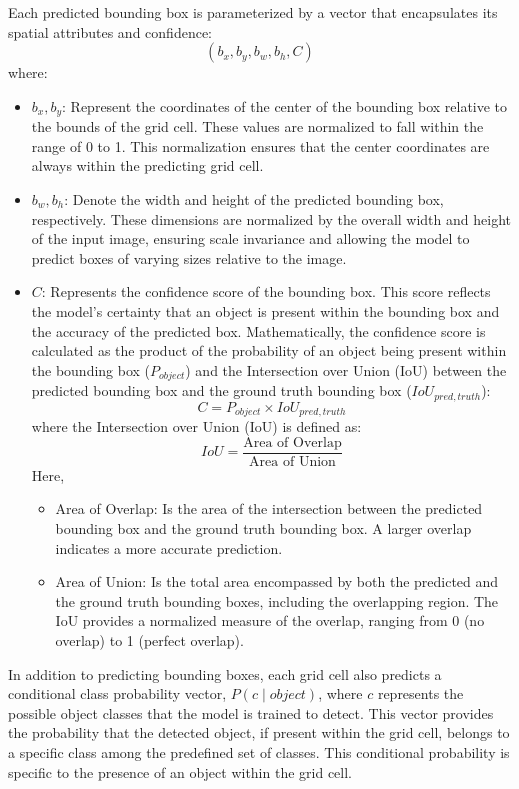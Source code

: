Each predicted bounding box is parameterized by a vector that encapsulates its spatial attributes and confidence:
$$
(b_x, b_y, b_w, b_h, C)
$$
where:
\begin{itemize}
    \item $b_x, b_y$: Represent the coordinates of the center of the bounding box relative to the bounds of the grid cell. These values are normalized to fall within the range of 0 to 1. This normalization ensures that the center coordinates are always within the predicting grid cell.
    \item $b_w, b_h$: Denote the width and height of the predicted bounding box, respectively. These dimensions are normalized by the overall width and height of the input image, ensuring scale invariance and allowing the model to predict boxes of varying sizes relative to the image.
    \item $C$: Represents the confidence score of the bounding box. This score reflects the model's certainty that an object is present within the bounding box and the accuracy of the predicted box. Mathematically, the confidence score is calculated as the product of the probability of an object being present within the bounding box ($P_{object}$) and the Intersection over Union (IoU) between the predicted bounding box and the ground truth bounding box ($IoU_{pred, truth}$):
    $$
    C = P_{object} \times IoU_{pred, truth}
    $$
    where the Intersection over Union (IoU) is defined as:
    $$
    IoU = \frac{\text{Area of Overlap}}{\text{Area of Union}}
    $$
    Here,
    \begin{itemize}
        \item Area of Overlap: Is the area of the intersection between the predicted bounding box and the ground truth bounding box. A larger overlap indicates a more accurate prediction.
        \item Area of Union: Is the total area encompassed by both the predicted and the ground truth bounding boxes, including the overlapping region. The IoU provides a normalized measure of the overlap, ranging from 0 (no overlap) to 1 (perfect overlap).
    \end{itemize}
\end{itemize}

In addition to predicting bounding boxes, each grid cell also predicts a conditional class probability vector, $P(c \mid object)$, where $c$ represents the possible object classes that the model is trained to detect. This vector provides the probability that the detected object, if present within the grid cell, belongs to a specific class among the predefined set of classes. This conditional probability is specific to the presence of an object within the grid cell.

